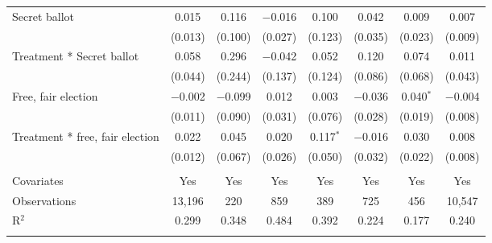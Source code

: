 \documentclass[]{article}
\begin{document}
\begin{table}[!htbp]
\begin{tabular}{@{\extracolsep{1pt}}lccccccc}
  Secret ballot & 0.015 & 0.116 & $-$0.016 & 0.100 & 0.042 & 0.009 & 0.007 \\ 
  & (0.013) & (0.100) & (0.027) & (0.123) & (0.035) & (0.023) & (0.009) \\ 
  Treatment * Secret ballot & 0.058 & 0.296 & $-$0.042 & 0.052 & 0.120 & 0.074 & 0.011 \\ 
  & (0.044) & (0.244) & (0.137) & (0.124) & (0.086) & (0.068) & (0.043) \\ 
  Free, fair election & $-$0.002 & $-$0.099 & 0.012 & 0.003 & $-$0.036 & 0.040$^{*}$ & $-$0.004 \\ 
  & (0.011) & (0.090) & (0.031) & (0.076) & (0.028) & (0.019) & (0.008) \\ 
  Treatment * free, fair election & 0.022 & 0.045 & 0.020 & 0.117$^{*}$ & $-$0.016 & 0.030 & 0.008 \\ 
  & (0.012) & (0.067) & (0.026) & (0.050) & (0.032) & (0.022) & (0.008) \\ 
 \hline \\[-1.8ex] 
Covariates & Yes & Yes & Yes & Yes & Yes & Yes & Yes \\ 
Observations & 13,196 & 220 & 859 & 389 & 725 & 456 & 10,547 \\ 
R$^{2}$ & 0.299 & 0.348 & 0.484 & 0.392 & 0.224 & 0.177 & 0.240 \\ 
\hline 
\hline \\[-1.8ex] 
\end{tabular} 
\end{table}

\clearpage
\end{document}
